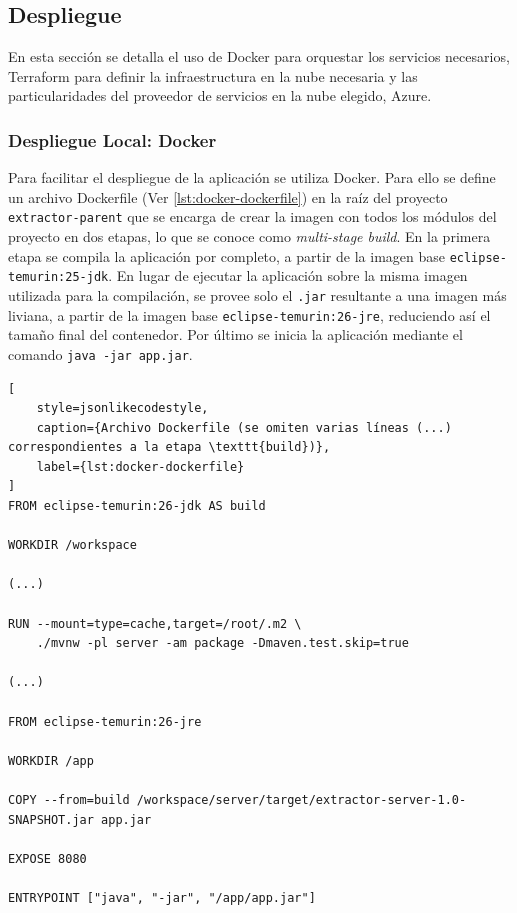 \subsection{Despliegue}%
\label{subsec:deployment}

En esta sección se detalla el uso de Docker para orquestar los servicios necesarios, Terraform para definir la
infraestructura en la nube necesaria y las particularidades del proveedor de servicios en la nube elegido, Azure.

\subsubsection{Despliegue Local: Docker}

Para facilitar el despliegue de la aplicación se utiliza Docker.
Para ello se define un archivo Dockerfile (Ver \autoref{lst:docker-dockerfile}) en la raíz del proyecto
\texttt{extractor-parent} que se encarga de crear
la imagen con todos los módulos del proyecto en dos etapas, lo que se conoce como \textit{multi-stage build}.
En la primera etapa se compila la aplicación por completo, a partir de la imagen base \texttt{eclipse-temurin:25-jdk}.
En lugar de ejecutar la aplicación sobre la misma imagen utilizada para la compilación, se provee solo el \texttt{.jar}
resultante a una imagen más liviana, a partir de la imagen base \texttt{eclipse-temurin:26-jre}, reduciendo así el
tamaño final del contenedor.
Por último se inicia la aplicación mediante el comando \texttt{java -jar app.jar}.

\begin{lstlisting}[
    style=jsonlikecodestyle,
    caption={Archivo Dockerfile (se omiten varias líneas (...) correspondientes a la etapa \texttt{build})},
    label={lst:docker-dockerfile}
]
FROM eclipse-temurin:26-jdk AS build

WORKDIR /workspace

(...)

RUN --mount=type=cache,target=/root/.m2 \
    ./mvnw -pl server -am package -Dmaven.test.skip=true

(...)

FROM eclipse-temurin:26-jre

WORKDIR /app

COPY --from=build /workspace/server/target/extractor-server-1.0-SNAPSHOT.jar app.jar

EXPOSE 8080

ENTRYPOINT ["java", "-jar", "/app/app.jar"]

\end{lstlisting}

